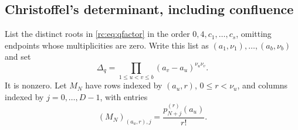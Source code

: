 \documentclass[11pt,a4paper]{article}
\numberwithin{equation}{section}
\theoremstyle{definition}
\theoremstyle{remark}
\begin{document}
\subsection{Christoffel's determinant, including confluence}
List the distinct roots in \eqref{rc:eq:qfactor} in the order
$0,4,c_1,\ldots,c_s$, omitting endpoints whose multiplicities are zero.
Write this list as $(a_1,\nu_1),\ldots,(a_b,\nu_b)$ and set
\begin{equation}\label{rc:eq:delta}
 \Delta_q=\prod_{1\le u<v\le b}(a_v-a_u)^{\nu_u\nu_v}.
\end{equation}
It is nonzero.  Let $M_N$ have rows indexed by $(a_u,r)$,
$0\le r<\nu_u$, and columns indexed by $j=0,\ldots,D-1$, with entries
\begin{equation}\label{rc:eq:MN}
 (M_N)_{(a_u,r),j}=\frac{p_{N+j}^{(r)}(a_u)}{r!}.
\end{equation}
\end{document}
